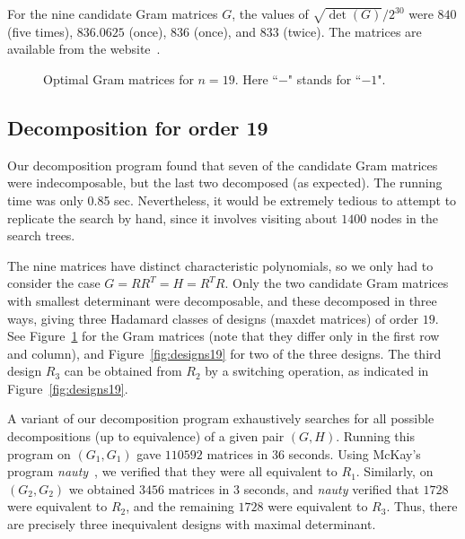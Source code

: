 \documentclass[11pt,a4paper]{article}
\begin{document}
For the nine candidate Gram matrices $G$, the values of
$\sqrt{\det(G)}/2^{30}$ were $840$ (five times),
$836.0625$ (once), $836$ (once), and $833$ (twice).
The matrices are available from the website~\cite{www37}.

\begin{center}
\begin{figure}[htbp]


\caption{Optimal Gram matrices for $n=19$.  
	 Here ``$-$" stands for ``$-1$".}
\label{fig:gram19}
\end{figure}
\end{center}

\subsection{Decomposition for order 19} \label{subsec:decomp19}

Our decomposition program found that seven of the candidate Gram
matrices were indecomposable, but the last two decomposed (as expected).
The running time was only 0.85 sec.  
Nevertheless, it would be extremely
tedious to attempt to replicate the search by hand, since it involves
visiting about $1400$ nodes in the search trees.

The nine matrices have distinct characteristic polynomials, so we only
had to consider the case $G = RR^T = H = R^TR$. Only the
two candidate Gram matrices with smallest determinant were decomposable, and
these decomposed in three ways, giving three Hadamard classes of
designs (maxdet matrices) of order $19$. See Figure~\ref{fig:gram19} for
the Gram matrices (note that they differ only in the first row and column), 
and Figure~\ref{fig:designs19} for two of the three designs.
The third design $R_3$ can be obtained from $R_2$ by a switching
operation, as indicated in Figure~\ref{fig:designs19}.

A variant of our decomposition program exhaustively searches for
all possible decompositions (up to equivalence) of a given pair $(G,H)$.
Running this program on $(G_1,G_1)$ gave $110592$ matrices in 36 seconds.
Using McKay's program \emph{nauty}~\cite{McKay79,nauty},
we verified that they were all equivalent to $R_1$.  
Similarly, on $(G_2,G_2)$ we obtained $3456$ matrices in 3 seconds, 
and \emph{nauty}
verified that $1728$ were equivalent to $R_2$, and the remaining
$1728$ were equivalent to $R_3$.  Thus, there are precisely three
inequivalent designs with maximal determinant.
\end{document}

